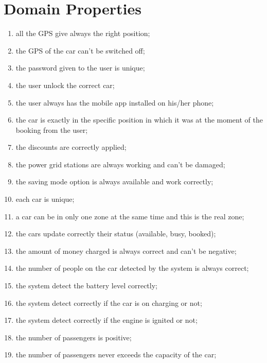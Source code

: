 \section{Domain Properties}
\begin{enumerate}
	\item all the GPS give always the right position;
	\item the GPS of the car can't be switched off;
	\item the password given to the user is unique;
	\item the user unlock the correct car;
	\item the user always has the mobile app installed on his/her phone;
	\item the car is exactly in the specific position in which it was at the moment of the booking from the user;
	\item the discounts are correctly applied;
	\item the power grid stations are always working and can't be damaged;
	\item the saving mode option is always available and work correctly;
	\item each car is unique;
	\item a car can be in only one zone at the same time and this is the real zone;
	\item the cars update correctly their status (available, busy, booked);
    \item the amount of money charged is always correct and can't be negative;
    \item the number of people on the car detected by the system is always correct;
    \item the system detect the battery level correctly;
    \item the system detect correctly if the car is on charging or not;
    \item the system detect correctly if the engine is ignited or not;
    \item the number of passengers is positive;
    \item the number of passengers never exceeds the capacity of the car;

    
  
   
    
\end{enumerate}
